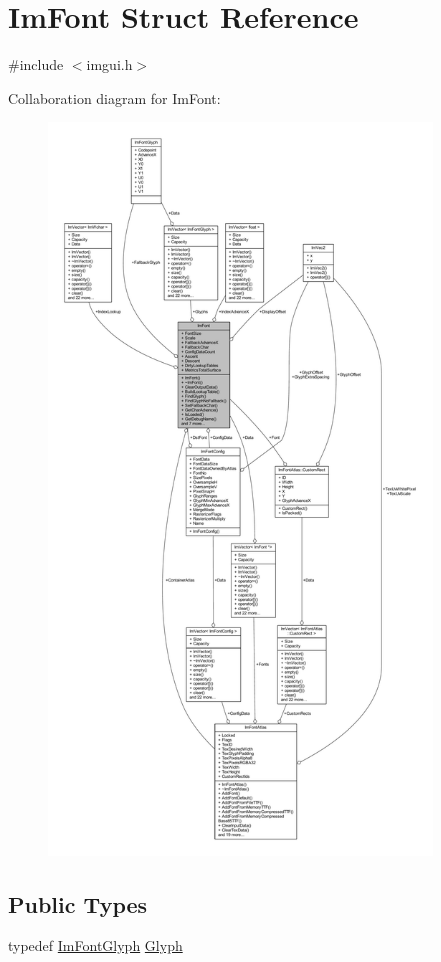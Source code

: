\hypertarget{struct_im_font}{}\section{Im\+Font Struct Reference}
\label{struct_im_font}


{\ttfamily \#include $<$imgui.\+h$>$}



Collaboration diagram for Im\+Font\+:
\nopagebreak
\begin{figure}[H]
\begin{center}
\leavevmode
\includegraphics[height=550pt]{struct_im_font__coll__graph}
\end{center}
\end{figure}
\subsection*{Public Types}
\begin{DoxyCompactItemize}
\item 
typedef \mbox{\hyperlink{struct_im_font_glyph}{Im\+Font\+Glyph}} \mbox{\hyperlink{struct_im_font_a4b802233ac8d3f3beddc395837288683}{Glyph}}
\end{DoxyCompactItemize}
